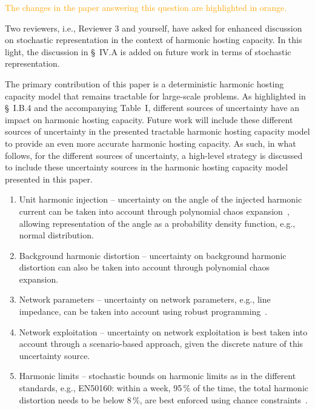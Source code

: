 \documentclass[10pt]{article}
\begin{document}
\begin{tcolorbox}[colback=black!5!white,colframe=black]
\textcolor{orange}{The changes in the paper answering this question are highlighted in orange.} \newline 

Two reviewers, i.e., Reviewer 3 and yourself, have asked for enhanced discussion on  stochastic representation in the context of harmonic hosting capacity. In this light, the discussion in \S~IV.A is added on future work in terms of stochastic representation. \newline

The primary contribution of this paper is a deterministic harmonic hosting capacity model that remains tractable for large-scale problems. As highlighted in \S~I.B.4 and the accompanying Table~I, different sources of uncertainty have an impact on harmonic hosting capacity. Future work will include these different sources of uncertainty in the presented tractable harmonic hosting capacity model to provide an even more accurate harmonic hosting capacity. As such, in what follows, for the different sources of uncertainty, a high-level strategy is discussed to include these uncertainty sources in the harmonic hosting capacity model presented in this paper.
\begin{enumerate}
    \item [a)] Unit harmonic injection -- uncertainty on the angle of the injected harmonic current can be taken into account through polynomial chaos expansion~\cite{sullivan_introduction_2015}, allowing representation of the angle as a probability density function, e.g., normal distribution.
    \item [b)] Background harmonic distortion -- uncertainty on background harmonic distortion can also be taken into account through polynomial chaos expansion.
    \item [c)] Network parameters -- uncertainty on network parameters, e.g., line impedance, can be taken into account using robust programming~\cite{nemirovski_robust_2019}.
    \item [d)] Network exploitation -- uncertainty on network exploitation is best taken into account through a scenario-based approach, given the discrete nature of this uncertainty source.
    \item [e)] Harmonic limits -- stochastic bounds on harmonic limits as in the different standards, e.g., EN50160: within a week, 95\,\% of the time, the total harmonic distortion needs to be below 8\,\%, are best enforced using chance constraints~\cite{birge_introduction_2011}.
\end{enumerate}

\end{tcolorbox}
 
\end{document}
